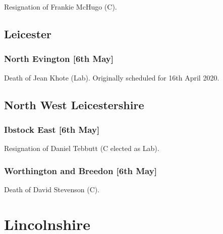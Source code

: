 \documentclass[a4paper,openany]{book}
\begin{document}
\begin{resultsiii}

Resignation of Frankie McHugo (C).

\subsection*{Leicester}

\subsubsection*{North Evington \hspace*{\fill}\nolinebreak[1]%
	\enspace\hspace*{\fill}
	[6th May]}


Death of Jean Khote (Lab).  Originally scheduled for 16th April 2020.

\subsection*{North West Leicestershire}

\subsubsection*{Ibstock East \hspace*{\fill}\nolinebreak[1]%
	\enspace\hspace*{\fill}
	[6th May]}


Resignation of Daniel Tebbutt (C elected as Lab).

\subsubsection*{Worthington and Breedon \hspace*{\fill}\nolinebreak[1]%
	\enspace\hspace*{\fill}
	[6th May]}


Death of David Stevenson (C).

\section{Lincolnshire}


\end{resultsiii}
\end{document}

